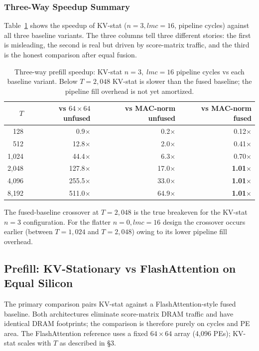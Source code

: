 \documentclass[11pt]{article}
\begin{document}
\subsubsection*{Three-Way Speedup Summary}

Table~\ref{tab:speedup_3way} shows the speedup of KV-stat
(\(n=3, lmc=16\), pipeline cycles) against all three baseline
variants.
The three columns tell three different stories:
the first is misleading, the second is real but driven by
score-matrix traffic, and the third is the honest comparison
after equal fusion.

\begin{table}[H]
\centering
\caption{Three-way prefill speedup: KV-stat \(n=3,\;lmc=16\)
pipeline cycles vs each baseline variant.
Below \(T=2{,}048\) KV-stat is slower than the fused baseline;
the pipeline fill overhead is not yet amortized.}
\label{tab:speedup_3way}
\begin{tabular}{rrrr}
\toprule
\(T\) & vs \(64{\times}64\) unfused & vs MAC-norm unfused & vs MAC-norm fused \\
\midrule
128   &  0.9$\times$ &  0.2$\times$ & 0.12$\times$ \\
512   & 12.8$\times$ &  2.0$\times$ & 0.41$\times$ \\
1,024 & 44.4$\times$ &  6.3$\times$ & 0.70$\times$ \\
2,048 & 127.8$\times$ & 17.0$\times$ & \textbf{1.01$\times$} \\
4,096 & 255.5$\times$ & 33.0$\times$ & \textbf{1.01$\times$} \\
8,192 & 511.0$\times$ & 64.9$\times$ & \textbf{1.01$\times$} \\
\bottomrule
\end{tabular}
\end{table}

The fused-baseline crossover at \(T = 2{,}048\) is the true
breakeven for the KV-stat \(n=3\) configuration.
For the flatter \(n=0, lmc=16\) design the crossover occurs
earlier (between \(T=1{,}024\) and \(T=2{,}048\)) owing to
its lower pipeline fill overhead.

\subsection{Prefill: KV-Stationary vs FlashAttention on Equal Silicon}

The primary comparison pairs KV-stat against a FlashAttention-style
fused baseline.
Both architectures eliminate score-matrix DRAM traffic and have
identical DRAM footprints; the comparison is therefore purely on
cycles and PE area.
The FlashAttention reference uses a fixed \(64 \times 64\) array
(4{,}096 PEs); KV-stat scales with \(T\) as described in \S3.
\end{document}
